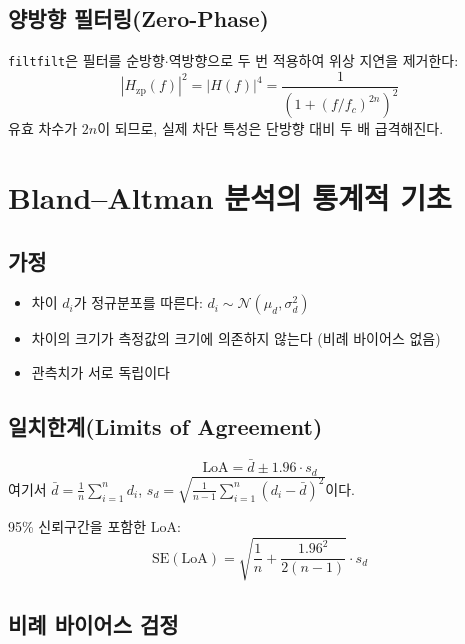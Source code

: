 \documentclass[11pt, a4paper]{report}
\begin{document}
\subsection{양방향 필터링(Zero-Phase)}

\texttt{filtfilt}은 필터를 순방향$\cdot$역방향으로 두 번 적용하여 위상 지연을 제거한다:
\begin{equation}
  |H_{\text{zp}}(f)|^2 = |H(f)|^4 = \frac{1}{\left(1 + (f/f_c)^{2n}\right)^2}
\end{equation}
유효 차수가 $2n$이 되므로, 실제 차단 특성은 단방향 대비 두 배 급격해진다.

\section{Bland--Altman 분석의 통계적 기초}

\subsection{가정}

\begin{itemize}[nosep]
  \item 차이 $d_i$가 정규분포를 따른다: $d_i \sim \mathcal{N}(\mu_d, \sigma_d^2)$
  \item 차이의 크기가 측정값의 크기에 의존하지 않는다 (비례 바이어스 없음)
  \item 관측치가 서로 독립이다
\end{itemize}

\subsection{일치한계(Limits of Agreement)}

\begin{equation}
  \text{LoA} = \bar{d} \pm 1.96 \cdot s_d
\end{equation}
여기서 $\bar{d} = \frac{1}{n}\sum_{i=1}^{n} d_i$, $s_d = \sqrt{\frac{1}{n-1}\sum_{i=1}^{n}(d_i - \bar{d})^2}$이다.

95\% 신뢰구간을 포함한 LoA:
\begin{equation}
  \text{SE}(\text{LoA}) = \sqrt{\frac{1}{n} + \frac{1.96^2}{2(n-1)}} \cdot s_d
\end{equation}

\subsection{비례 바이어스 검정}
\end{document}
